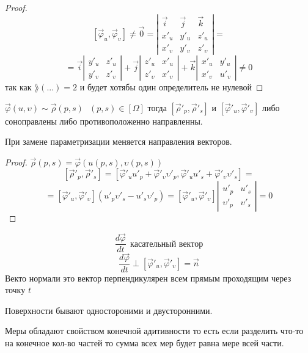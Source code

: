\begin{proof}
  $$
  [\vec \varphi_u, \vec \varphi_{\upsilon}] \not = \vec 0 =
  \left|
  \begin{array}{ccc}
    \vec i & \vec j & \vec k \\
    x'_u & y'_u & z'_u \\
    x'_{\upsilon} & y'_{\upsilon} & z'_{\upsilon}
  \end{array}
  \right| =
  $$
  $$
  = \vec i \left|
  \begin{array}{cc}
    y'_u & z'_u \\
    y'_{\upsilon} & z'_{\upsilon}
  \end{array}
  \right| +
  \vec j \left|
  \begin{array}{cc}
    z'_u & x'_u \\
    z'_{\upsilon} & x'_{\upsilon}
  \end{array}
  \right| +
  \vec k \left|
  \begin{array}{cc}
    x'_u & y'_u \\
    x'_{\upsilon} & u'_{\upsilon}
  \end{array}
  \right| \not = 0
  $$
  так как $\rang(...) = 2$ и будет хотябы один определитель не нулевой
\end{proof}

\begin{theorem}
  $\vec \varphi(u, \upsilon) \sim \vec \rho(p,s) ~~~ (p, s) \in [\Omega]$ тогда
  $[\vec \rho'_p, \vec \rho'_s]$ и $[\vec \varphi'_u, \vec \varphi'_{\upsilon}]$
  либо соноправлены либо противоположенно направленны.

  При замене параметризации меняется направления векторов.
\end{theorem}

\begin{proof}
  $\vec \rho(p,s) = \vec \varphi(u(p,s), \upsilon(p,s))$
  $$
  [\vec \rho'_p, \vec \rho'_s] = [\vec \varphi'_u u'_p +
  \vec \varphi'_{\upsilon} \upsilon'_p, \vec \varphi'_u u'_s +
  \vec \varphi'_{\upsilon} \upsilon'_s] =
  $$
  $$
  = [\vec \varphi'_u, \vec \varphi'_{\upsilon}] (u'_p \upsilon'_s -
  u'_s \upsilon'_p) = [\vec \varphi'_u, \vec \varphi'_{\upsilon}]
  \left|
  \begin{array}{cc}
    u'_p & u'_s \\
    \upsilon'_p & \upsilon'_s
  \end{array}
  \right| = 0
  $$
\end{proof}

\begin{define}
  $$
  \frac{d \vec \varphi}{dt} ~~ \text{касательный вектор}
  $$
  $$
  \frac{d \vec \varphi}{dt} \perp [\vec \varphi'_u, \vec \varphi'_{\upsilon}]
  = \vec n
  $$
  Векто нормали это вектор перпендикулярен всем прямым проходящим через точку
  $t$

  Поверхности бывают одностороними и двусторонними.

  Меры обладают свойством конечной адитивности то есть если разделить что-то
  на конечное кол-во частей то сумма всех мер будет равна мере всей части.
\end{define}

